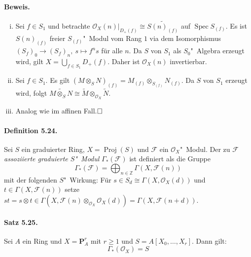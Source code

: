 \documentclass[11pt,b5paper,openany]{memoir}
\def \qed {$\hfill\square$}
\begin{document}
\paragraph{Beweis.}\begin{enumerate}[(i)]
\item Sei $f\in S_1$ und betrachte $\mathcal{O}_X(n)|_{D_+(f)}\cong\widetilde{S(n)_{(f)}}$ auf $\operatorname{Spec}S_{(f)}$. Es ist $S(n)_{(f)}$ freier $S_{(f)}$"~Modul vom Rang $1$ via dem Isomorphismus $(S_f)_0\to (S_f)_n,\ s\mapsto f^ns$ für alle $n$. Da $S$ von $S_1$ als $S_0$"~Algebra erzeugt wird, gilt $X=\bigcup_{f\in S_1}D_+(f)$. Daher ist $\mathcal{O}_X(n)$ invertierbar.
\item Sei $f\in S_1$. Es gilt $(M\otimes_SN)_{(f)}=M_{(f)}\otimes_{S_{(f)}}N_{(f)}$. Da $S$ von $S_1$ erzeugt wird, folgt $\widetilde{M\otimes_SN}\cong\widetilde{M}\otimes_{\mathcal{O}_X}\widetilde{N}$.
\item Analog wie im affinen Fall.\qed
\end{enumerate}

\paragraph{Definition 5.24.}\label{5.24} Sei $S$ ein graduierter Ring, $X=\operatorname{Proj}(S)$ und $\mathcal{F}$ ein $\mathcal{O}_X$"~Modul. Der zu $\mathcal{F}$ \textit{assoziierte graduierte $S$"~Modul} $\Gamma_\ast(\mathcal{F})$ ist definiert als die Gruppe
\[\Gamma_\ast(\mathcal{F})=\bigoplus_{n\in\mathbb{Z}}\Gamma(X,\mathcal{F}(n)) \]
mit der folgenden $S$"~Wirkung: Für $s\in S_d\cong\Gamma(X,\mathcal{O}_X(d))$ und $t\in\Gamma(X,\mathcal{F}(n))$ setze $st= s\otimes t\in\Gamma(X,\mathcal{F}(n)\otimes_{\mathcal{O}_X}\mathcal{O}_X(d))=\Gamma(X,\mathcal{F}(n+d))$.

\paragraph{Satz 5.25.}\label{5.25} Sei $A$ ein Ring und $X=\mathbf{P}_A^r$ mit $r\geq 1$ und $S=A[X_0,\ldots,X_r]$. Dann gilt:
\[\Gamma_\ast(\mathcal{O}_X)= S \]
\end{document}
